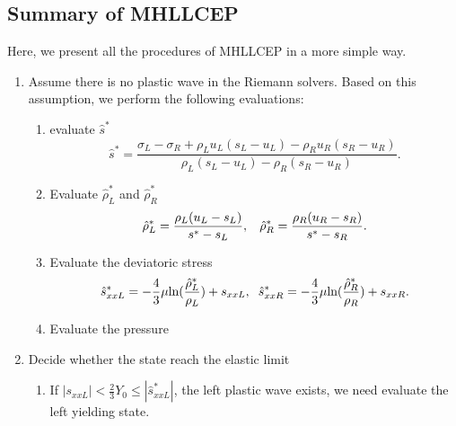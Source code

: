\documentclass{article}
\numberwithin{equation}{section}
\numberwithin{table}{section}
\begin{document}
\subsection{Summary of MHLLCEP}
Here, we present all the procedures of MHLLCEP in a more simple way.
\begin{enumerate}
  \item  Assume there is no plastic wave in the Riemann solvers. Based on this assumption, we perform the following evaluations:
  \begin{enumerate}
    \item evaluate  $\hat{s}^*$
    \begin{equation*}
       \hat{s}^* = \frac{\sigma_L-\sigma_R+\rho_L u_L(s_L-u_L)-\rho_R u_R(s_R-u_R)}{\rho_L(s_L-u_L)-\rho_R(s_R-u_R)}.
   \end{equation*}
    \item Evaluate  $\hat{\rho}_L^*$ and $\hat{\rho}_R^*$
    \begin{equation*}
       \hat{\rho}_L^* = \frac{\rho_L(u_L-s_L)}{s^*-s_L}, \hspace{0.3cm}  \hat{\rho}_R^* = \frac{\rho_R(u_R-s_R)}{s^*-s_R}.
    \end{equation*}
    \item Evaluate  the deviatoric stress
       \begin{equation*}
        \hat{s}_{xxL}^*=-\frac{4}{3}\mu\text{ln}(\frac{\hat{\rho}_L^*}{\rho_L})+s_{xxL},\hspace{0.2cm}  \hat{s}_{xxR}^*=-\frac{4}{3}\mu\text{ln}(\frac{\hat{\rho}_R^*}{\rho_R})+s_{xxR}.
      \end{equation*}
    \item Evaluate the pressure
  \end{enumerate}
  \item Decide whether the state reach the elastic limit
        \begin{enumerate}
          \item If $|s_{xxL}| < \frac{2}{3}Y_0 \le |\hat{s}_{xxL}^*| $, the left plastic wave exists, we need evaluate the left yielding state.


\end{enumerate}
\end{enumerate}
\end{document}
